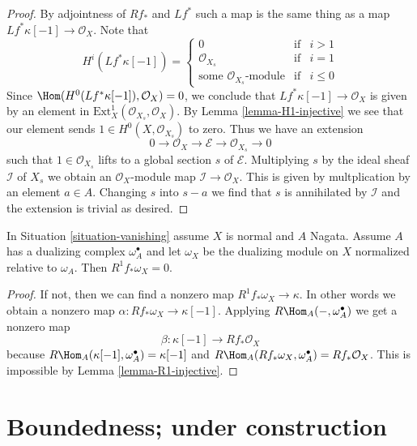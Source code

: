 \begin{proof}
By adjointness of $Rf_*$ and $Lf^*$ such a map is the same thing
as a map $Lf^*\kappa[-1] \to \mathcal{O}_X$. Note that
$$
H^i(Lf^*\kappa[-1]) =
\left\{
\begin{matrix}
0 & \text{if} & i > 1 \\
\mathcal{O}_{X_s} & \text{if} & i = 1 \\
\text{some }\mathcal{O}_{X_s}\text{-module} & \text{if} & i \leq 0
\end{matrix}
\right.
$$
Since $\Hom(H^0(Lf^*\kappa[-1]), \mathcal{O}_X) = 0$, we conclude that
$Lf^*\kappa[-1] \to \mathcal{O}_X$ is given by an element in
$\text{Ext}^1_X(\mathcal{O}_{X_s}, \mathcal{O}_X)$. By Lemma
\ref{lemma-H1-injective} we see that our element sends
$1 \in H^0(X, \mathcal{O}_{X_s})$ to zero. Thus we have an extension
$$
0 \to \mathcal{O}_X \to \mathcal{E} \to \mathcal{O}_{X_s} \to 0
$$
such that $1 \in \mathcal{O}_{X_s}$ lifts to a global section $s$ of
$\mathcal{E}$. Multiplying $s$ by the ideal sheaf $\mathcal{I}$
of $X_s$ we obtain an $\mathcal{O}_X$-module map
$\mathcal{I} \to \mathcal{O}_X$. This is given by multplication
by an element $a \in A$. Changing $s$ into $s -  a$ we find that
$s$ is annihilated by $\mathcal{I}$ and the extension is trivial
as desired.
\end{proof}


\begin{proposition}
\label{proposition-Grauert-Riemenschneider}
In Situation \ref{situation-vanishing} assume $X$ is normal and $A$ Nagata.
Assume $A$ has a dualizing complex $\omega_A^\bullet$ and let $\omega_X$
be the dualizing module on $X$ normalized relative to $\omega_A$.
Then $R^1f_*\omega_X = 0$.
\end{proposition}

\begin{proof}
If not, then we can find a nonzero map $R^1f_*\omega_X \to \kappa$.
In other words we obtain a nonzero map $\alpha : Rf_*\omega_X \to \kappa[-1]$.
Applying $R\Hom_A(-, \omega_A^\bullet)$ we get a nonzero map
$$
\beta : \kappa[-1] \longrightarrow Rf_*\mathcal{O}_X
$$
because $R\Hom_A(\kappa[-1], \omega_A^\bullet) = \kappa[-1]$
and $R\Hom_A(Rf_*\omega_X, \omega_A^\bullet) = Rf_*\mathcal{O}_X$.
This is impossible by Lemma \ref{lemma-R1-injective}.
\end{proof}





\section{Boundedness; under construction}
\label{section-bounded}


